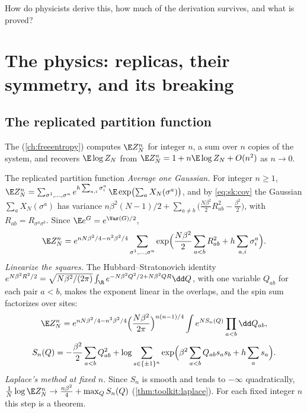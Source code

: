 \begin{refsection}
How do physicists derive this, how much of the derivation survives, and what is proved?

\section{The physics: replicas, their symmetry, and its breaking}\label{sec:sk:physics}

\subsection{The replicated partition function}\label{sec:sk:replicas}

The  (\cref{ch:freeentropy}) computes $\E Z_N^n$ for integer $n$, a sum over $n$ copies of the system, and recovers $\E\log Z_N$ from $\E Z_N^n=1+n\E\log Z_N+O(n^2)$ as $n\to0$.

\begin{computation}{The replicated partition function}\label{comp:sk:replicated}
\step \emph{Average one Gaussian.} For integer $n\ge1$, $\E Z_N^n=\sum_{\sigma^1,\dots,\sigma^n}e^{h\sum_{a,i}\sigma^a_i}\,\E\exp\bigl(\sum_aX_N(\sigma^a)\bigr)$, and by \eqref{eq:sk:cov} the Gaussian $\sum_aX_N(\sigma^a)$ has variance $n\beta^2(N-1)/2+\sum_{a\ne b}\bigl(\frac{N\beta^2}2R_{ab}^2-\frac{\beta^2}2\bigr)$, with $R_{ab}=R_{\sigma^a\sigma^b}$. Since $\E e^G=e^{\Var(G)/2}$,
\begin{equation}\label{eq:sk:replicated}
\E Z_N^n=e^{nN\beta^2/4-n^2\beta^2/4}\sum_{\sigma^1,\dots,\sigma^n}\exp\Bigl(\frac{N\beta^2}2\sum_{a<b}R_{ab}^2+h\sum_{a,i}\sigma^a_i\Bigr).
\end{equation}
\step \emph{Linearize the squares.} The Hubbard--Stratonovich identity $e^{N\beta^2R^2/2}=\sqrt{N\beta^2/(2\pi)}\int_\R e^{-N\beta^2Q^2/2+N\beta^2QR}\dd Q$, with one variable $Q_{ab}$ for each pair $a<b$, makes the exponent linear in the overlaps, and the spin sum factorizes over sites:
\[
\E Z_N^n=e^{nN\beta^2/4-n^2\beta^2/4}\Bigl(\frac{N\beta^2}{2\pi}\Bigr)^{n(n-1)/4}\int e^{NS_n(Q)}\prod_{a<b}\dd Q_{ab},
\]
\[
S_n(Q)=-\frac{\beta^2}2\sum_{a<b}Q_{ab}^2+\log\sum_{s\in\{\pm1\}^n}\exp\Bigl(\beta^2\sum_{a<b}Q_{ab}s_as_b+h\sum_as_a\Bigr).
\]
\step \emph{Laplace's method at fixed $n$.} Since $S_n$ is smooth and tends to $-\infty$ quadratically, $\frac1N\log\E Z_N^n\to\frac{n\beta^2}4+\max_QS_n(Q)$ (\cref{thm:toolkit:laplace}). For each fixed integer $n$ this step is a theorem.
\end{computation}


\end{refsection}
